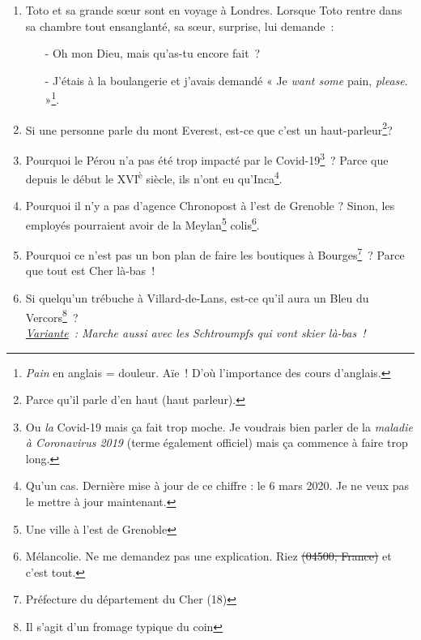\documentclass[10pt,a5paper,fullpage]{book}
\begin{document}
\begin{enumerate}
		$\zeta\zeta\zeta\zeta\zeta$ $\zeta\zeta\zeta\zeta\zeta$ $\zeta\zeta\zeta\zeta\zeta$ $\zeta\zeta\zeta\zeta\zeta$  $\zeta\zeta\zeta\zeta\zeta$ \\
		↑ Les Zêta-Unis\footnote{Et en plus, il y a 50 zêtas~! Quelle coïncidence~! (référence aux USA et à ses 50 États).}.			
		\item Toto et sa grande sœur sont en voyage à Londres. Lorsque Toto rentre dans sa chambre tout ensanglanté, sa sœur, surprise, lui demande~:
		\begin{itemize}
			\item[-] Oh mon Dieu, mais qu'as-tu encore fait~?
			\item[-] J’étais à la boulangerie et j’avais demandé « Je \textit{want some} pain, \textit{please}. »\footnote{\textit{Pain} en anglais = douleur. Aïe~! D'où l'importance des cours d'anglais.}.
		\end{itemize}
		\item Si une personne parle du mont Everest, est-ce que c’est un haut-parleur\footnote{Parce qu'il parle d'en haut (haut parleur).}?
		\item Pourquoi le Pérou n'a pas été trop impacté par le Covid-19\footnote{Ou \textit{la} Covid-19 mais ça fait trop moche. Je voudrais bien parler de la \textit{maladie à Coronavirus 2019} (terme également officiel) mais ça commence à faire trop long.}~? Parce que depuis le début le XVI\textsuperscript{è} siècle, ils n'ont eu qu'Inca\footnote{Qu'un cas. Dernière mise à jour de ce chiffre : le 6 mars 2020. Je ne veux pas le mettre à jour maintenant.}.
		\item Pourquoi il n'y a pas d'agence Chronopost à l'est de Grenoble ? Sinon, les employés pourraient avoir de la Meylan\footnote{Une ville à l'est de Grenoble} colis\footnote{Mélancolie. Ne me demandez pas une explication. Riez \sout{(04500, France)} et c'est tout.}. 
		\item Pourquoi ce n'est pas un bon plan de faire les boutiques à Bourges\footnote{Préfecture du département du Cher (18)}~? Parce que tout est Cher là-bas~!
		\item Si quelqu'un trébuche à Villard-de-Lans, est-ce qu'il aura un Bleu du Vercors\footnote{Il s'agit d'un fromage typique du coin}~?
		\\\textit{\underline{Variante}~: Marche aussi avec les Schtroumpfs qui vont skier là-bas~!}
	\end{enumerate}
\end{document}
